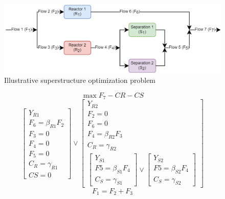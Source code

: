 \documentclass{juliacon}
\begin{document}
\begin{figure}[h]
    \centering
    \includegraphics[scale=0.4]{juliacon pfd ss.png}
    \caption{Illustrative superstructure optimization problem}
    \label{fig:superstruct_opt_diagram}
\end{figure}
\begin{equation}
    \label{eq:example_obj}
    \max F_7 - CR - CS
\end{equation}
\begin{equation}
    \label{eq:example_gdp}
    \begin{bmatrix}
        Y_{R1} \\
        F_6 = \beta_{R1} F_2 \\
        F_3 = 0 \\
        F_4 = 0 \\
        F_5 = 0 \\
        C_R = \gamma_{R1} \\
        CS = 0
    \end{bmatrix} \lor
    \begin{bmatrix}
        Y_{R2} \\
        F_2 = 0 \\
        F_6 = 0 \\
        F_4 = \beta_{R2} F_3 \\
        C_R = \gamma_{R2} \\
        \begin{bmatrix}
            Y_{S1} \\
            F5 = \beta_{S1} F_4 \\
            C_S = \gamma_{S1}
        \end{bmatrix} \lor
        \begin{bmatrix}
            Y_{S2} \\
            F5 = \beta_{S2} F_4 \\
            C_S = \gamma_{S2}
        \end{bmatrix}
    \end{bmatrix}
\end{equation}
\begin{equation}
    \label{eq:example_global}
    F_1 = F_2 + F_3
\end{equation}
\end{document}

